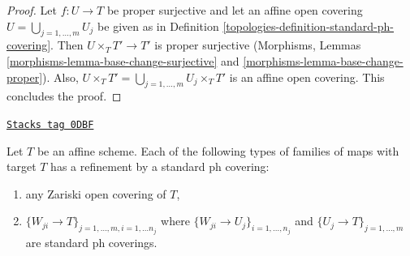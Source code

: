 \begin{proof}

Let $f : U \to T$ be proper surjective and let an affine open covering
$U = \bigcup_{j = 1, \ldots, m} U_j$ be given as in
Definition \ref{topologies-definition-standard-ph-covering}.
Then $U \times_T T' \to T'$ is proper surjective
(Morphisms, Lemmas \ref{morphisms-lemma-base-change-surjective} and
\ref{morphisms-lemma-base-change-proper}).
Also, $U \times_T T' = \bigcup_{j = 1, \ldots, m} U_j \times_T T'$
is an affine open covering.
This concludes the proof.
\end{proof}

\begin{lemma}
\label{topologies-lemma-refine-by-standard-ph}
\href{https://stacks.math.columbia.edu/tag/0DBF}{\texttt{Stacks tag 0DBF}}

Let $T$ be an affine scheme. Each of the following types of families
of maps with target $T$ has a refinement by a standard ph covering:
\begin{enumerate}
\item any Zariski open covering of $T$,
\item $\{W_{ji} \to T\}_{j = 1, \ldots, m, i = 1, \ldots n_j}$
where $\{W_{ji} \to U_j\}_{i = 1, \ldots, n_j}$
and $\{U_j \to T\}_{j = 1, \ldots, m}$ are standard ph coverings.
\end{enumerate}
\end{lemma}

